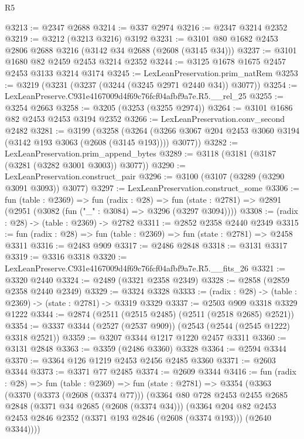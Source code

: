 \begin{lexlean}{R5}
\begin{coremodule}
@3213 := @2347 @2688
@3214 := @337 @2974
@3216 := @2347 @3214 @2352
@3219 := @3212 (@3213 @3216) @3192
@3231 := @3101 @80 @1682 @2453 @2806 @2688 @3216 (@3142 @34 @2688 (@2608 (@3145 @34)))
@3237 := @3101 @1680 @82 @2459 @2453 @3214 @2352
@3244 := @3125 @1678 @1675 @2457 @2453 @3133 @3214 @3174
@3245 := LexLeanPreservation.prim_natRem
@3253 := @3219 (@3231 (@3237 (@3244 (@3245 @2971 @2440 @34)) @3077))
@3254 := LexLeanPreserve.C931e4167009d4f69c76fcf04afbf9a7e.R5.__rel_25
@3255 := @3254 @2663
@3258 := @3205 (@3253 (@3255 @2974))
@3264 := @3101 @1686 @82 @2453 @2453 @3194 @2352
@3266 := LexLeanPreservation.conv_second @2482
@3281 := @3199
    (@3258
      (@3264 (@3266 @3067 @204 @2453 @3060 @3194 (@3142 @193 @3063 (@2608 (@3145 @193)))) @3077))
@3282 := LexLeanPreservation.prim_append_bytes
@3289 := @3118 (@3181 (@3187 (@3281 (@3282 @3001 @3003)) @3077))
@3290 := LexLeanPreservation.construct_pair
@3296 := @3100 (@3107 (@3289 (@3290 @3091 @3093)) @3077)
@3297 := LexLeanPreservation.construct_some
@3306 := fun (table : @2369) =>
  fun (radix : @28) =>
  fun (state : @2781) => @2891 (@2951 (@3082 (fun ("_" : @3084) => @3296 (@3297 @3094))))
@3308 := (radix : @28) -> (table : @2369) -> @2782
@3311 := @2852 @2358 @2440 @2349
@3315 := fun (radix : @28) => fun (table : @2369) => fun (state : @2781) => @2458 @3311
@3316 := @2483 @909
@3317 := @2486 @2848
@3318 := @3131 @3317
@3319 := @3316 @3318
@3320 := LexLeanPreserve.C931e4167009d4f69c76fcf04afbf9a7e.R5.__fits_26
@3321 := @3320 @2440
@3324 := @2489 (@3321 @2358 @2349)
@3328 := @2858 (@2859 @2358 @2440 @2349)
@3329 := @3324 @3328
@3333 := (radix : @28) -> (table : @2369) -> (state : @2781) -> @3319 @3329
@3337 := @2503 @909 @3318 @3329 @1222
@3344 := @2874 (@2511 (@2515 @2485) (@2511 (@2518 @2685) @2521))
@3354 := @3337 @3344 (@2527 (@2537 @909)) (@2543 (@2544 (@2545 @1222) @3318 @2521))
@3359 := @3207 @3344 @1217 @1220 @2457 @3311
@3360 := @3131 @2848
@3363 := @3359 (@2486 @3360) @3328
@3364 := @2594 @3344
@3370 := @3364 @126 @1219 @2453 @2456 @2485 @3360
@3371 := @2603 @3344
@3373 := @3371 @77 @2485
@3374 := @2609 @3344
@3416 := fun (radix : @28) =>
  fun (table : @2369) =>
  fun (state : @2781) =>
  @3354
    (@3363
      (@3370
        (@3373 (@2608 (@3374 @77)))
        (@3364
          @80
          @728
          @2453
          @2455
          @2685
          @2848
          (@3371 @34 @2685 (@2608 (@3374 @34)))
          (@3364
            @204
            @82
            @2453
            @2453
            @2846
            @2352
            (@3371 @193 @2846 (@2608 (@3374 @193)))
            (@2640 @3344))))

\end{coremodule}
\end{lexlean}
